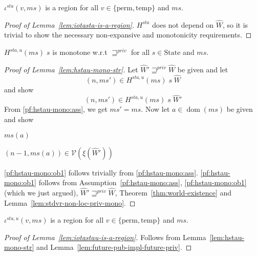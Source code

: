 \documentclass[a4paper]{article}
\DeclareMathOperator{\dom}{dom}
\newcommand{\var}[1]{\mathit{#1}}
\newcommand{\hs}{\var{ms}}
\newcommand{\ms}{\hs}
\newcommand{\addr}{\var{a}}
\newcommand{\sta}{\var{sta}}
\newcommand{\futurestr}{\mathbin{\sqsupseteq}^{\var{priv}}}
\newcommand{\asmType}{\plaindom{AsmType}}
\newcommand{\plaindom}[1]{\mathrm{#1}}
\newcommand{\States}{\plaindom{State}}
\newcommand{\intr}[2]{\mathcal{#1}}
\newcommand{\valueintr}[1]{\intr{V}{#1}}
\newcommand{\stdvr}{\valueintr{\asmType}}
\newcommand{\npair}[2][n]{\left(#1,#2 \right)}
\newcommand{\plainview}[1]{\mathrm{#1}}
\newcommand{\perma}{\plainview{perm}}
\newcommand{\temp}{\plainview{temp}}
\newcommand{\nonlocal}[1]{\ensuremath{#1} \text{ is non-local}}
\begin{document}
\begin{lemma}
  \label{lem:iotasta-is-a-region}
  $\iota^\sta(v,\ms)$ is a region for all $v \in \{\perma, \temp\}$ and $\ms$.
\end{lemma}
\begin{proof}[Proof of Lemma~\ref{lem:iotasta-is-a-region}]
  $H^\sta$ does not depend on $\hat{W}$, so it is trivial to show the necessary non-expansive and monotonicity requirements.
\end{proof}

\begin{lemma}
  \label{lem:hstau-mono-str}
  $H^{\sta,u}(\ms) \; s$ is monotone w.r.t $\futurestr$ for all $s \in \States$ and $\ms$.
\end{lemma}
\begin{proof}[Proof of Lemma~\ref{lem:hstau-mono-str}]
  Let $\hat{W}' \futurestr \hat{W}$ be given and let 
  \begin{equation}
    \label{pf:hstau-mono:ass}
    \npair{\ms'} \in H^{\sta,u}(\ms)\; s \; \hat{W}
  \end{equation}
  and show
  \[
    \npair{\ms'} \in H^{\sta,u}(\ms)\; s \; \hat{W}'
  \]
  From \ref{pf:hstau-mono:ass}, we get $\ms' = \ms$. Now let $\addr \in \dom(\ms)$ be given and show
  \begin{enumproof}
    \item \nonlocal{\ms(a)} \label{pf:hstau-mono:ob1}
    \item $\npair[n-1]{\ms(a)} \in \stdvr(\xi(\hat{W}'))$ \label{pf:hstau-mono:ob2}
  \end{enumproof}
  \ref{pf:hstau-mono:ob1} follows trivially from \ref{pf:hstau-mono:ass}. \ref{pf:hstau-mono:ob1} follows from Assumption~\ref{pf:hstau-mono:ass}, \ref{pf:hstau-mono:ob1} (which we just argued), $\hat{W}' \futurestr \hat{W}$, Theorem~\ref{thm:world-existence} and Lemma~\ref{lem:stdvr-non-loc-priv-mono}.
\end{proof}


\begin{lemma}
  \label{lem:iotastau-is-a-region}
  $\iota^{\sta,u}(v,\ms)$ is a region for all $v \in \{\perma, \temp\}$ and $\ms$.
\end{lemma}
\begin{proof}[Proof of Lemma~\ref{lem:iotastau-is-a-region}]
  Follows from Lemma~\ref{lem:hstau-mono-str} and Lemma~\ref{lem:future-pub-impl-future-priv}.
\end{proof}
\end{document}
